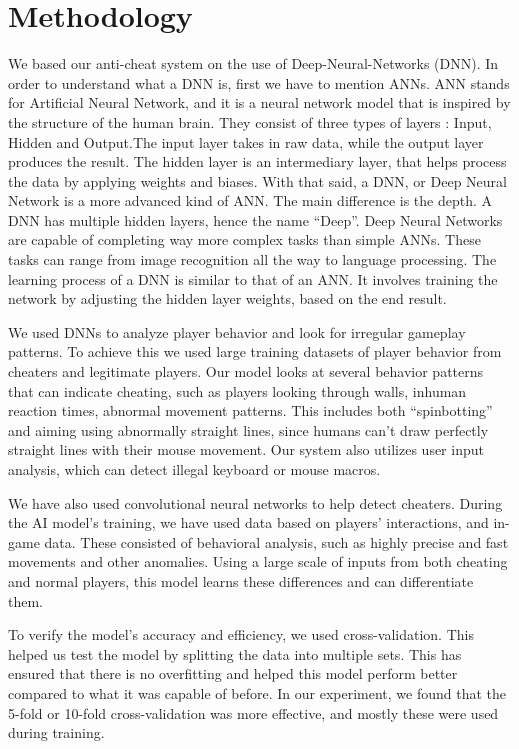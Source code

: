 \section{Methodology}
\label{ch:methodology}

We based our anti-cheat system on the use of Deep-Neural-Networks (DNN).
In order to understand what a DNN is, first we have to mention ANNs. ANN stands for Artificial Neural Network, and it is a neural network model that is inspired by the structure of the human brain. They consist of three types of layers : Input, Hidden and Output.The input layer takes in raw data, while the output layer produces the result. The hidden layer is an intermediary layer, that helps process the data by applying weights and biases.
With that said, a DNN, or Deep Neural Network is a more advanced kind of ANN. The main difference is the depth. A DNN has multiple hidden layers, hence the name “Deep”. Deep Neural Networks are capable of completing way more complex tasks than simple ANNs. These tasks can range from image recognition all the way to language processing. The learning process of a DNN is similar to that of an ANN. It involves training the network by adjusting the hidden layer weights, based on the end result.

We used DNNs to analyze player behavior and look for irregular gameplay patterns. To achieve this we used large training datasets of player behavior from cheaters and legitimate players. Our model looks at several behavior patterns that can indicate cheating, such as players looking through walls, inhuman reaction times, abnormal movement patterns. This includes both “spinbotting” and aiming using abnormally straight lines, since humans can’t draw perfectly straight lines with their mouse movement. Our system also utilizes user input analysis, which can detect illegal keyboard or mouse macros.

We have also used convolutional neural networks to help detect cheaters. During the AI model's training, we have used data based on players' interactions, and in-game data. These consisted of behavioral analysis, such as highly precise and fast movements and other anomalies. Using a large scale of inputs from both cheating and normal players, this model learns these differences and can differentiate them.

To verify the model's accuracy and efficiency, we used cross-validation. This helped us test the model by splitting the data into multiple sets. This has ensured that there is no overfitting and helped this model perform better compared to what it was capable of before. In our experiment, we found that the 5-fold or 10-fold cross-validation was more effective, and mostly these were used during training.


